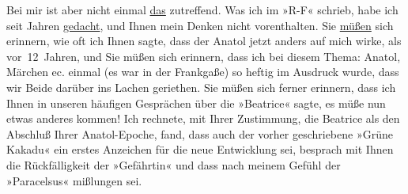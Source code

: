 \pstart
           Bei mir ist aber nicht einmal \uline{das} zutreffend. Was ich
               im »R-F« schrieb, habe ich
               seit Jahren \uline{gedacht}, und Ihnen mein Denken nicht
               vorenthalten. Sie \uline{müßen} sich erinnern, wie oft ich
               Ihnen sagte, dass der Anatol jetzt anders auf
               mich wirke, als vor 12 Jahren, und Sie müßen sich erinnern, dass ich bei diesem
               Thema: Anatol, Märchen ec. einmal (es war in der Frankgaße) so heftig im Ausdruck wurde, dass wir Beide darüber ins Lachen
               geriethen. Sie müßen sich ferner erinnern, dass ich Ihnen in unseren häufigen
               Gesprächen über die »Beatrice« sagte, es müße
               nun etwas anderes kommen! Ich {\pb}rechnete, mit Ihrer Zustimmung, die Beatrice
               als den Abschluß Ihrer Anatol-Epoche, fand, dass
               auch der vorher geschriebene »Grüne Kakadu« ein
               erstes Anzeichen für die neue Entwicklung sei, besprach mit Ihnen die Rückfälligkeit
               der »Gefährtin« und dass nach meinem Gefühl der
                  »Paracelsus« mißlungen sei.\pend
           
